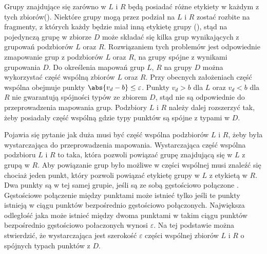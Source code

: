 Grupy znajdujące się zarówno w $ L $ i $ R $ będą posiadać różne etykiety w każdym z tych zbiorów(). Niektóre grupy mogą przez podział na $ L $ i $ R $ zostać rozbite na fragmenty, z których każdy będzie miał inną etykietę grupy (), stąd na pojedynczą grupę w zbiorze $ D $ może składać się kilka grup wynikających z grupowań podzbiorów $ L $ oraz $ R $. Rozwiązaniem tych problemów jest odpowiednie zmapowanie grup z podzbiorów $ L $ oraz $ R $, na grupy spójne z wynikami grupowania $ D $. Do określenia mapowań grup $ L $, $ R $ na grupy $ D $ można wykorzystać część wspólną zbiorów $ L $ oraz $ R $. Przy obecnych założeniach część wspólna obejmuje punkty $ \abs{v_d - b} \le \varepsilon $. Punkty $ v_d > b $ dla $ L $ oraz $ v_d < b $ dla $ R $ nie gwarantują spójności typów ze zbiorem $ D $, stąd nie są odpowiednie do przeprowadzenia mapowania grup. Podzbiory $ L $ i $ R $ należy dalej rozszerzyć tak, żeby posiadały część wspólną gdzie typy punktów są spójne z typami w $ D $.\par

Pojawia się pytanie jak duża musi być część wspólna podzbiorów $ L $ i $ R $, żeby była wystarczająca do przeprowadzenia mapowania. Wystarczająca część wspólna podzbioru $ L $ i $ R $ to taka, która pozwoli powiązać grupę znajdującą się w $ L $ z grupą w $ R $. Aby powiązanie grup było możliwe w części wspólnej musi znaleźć się chociaż jeden punkt, który pozwoli powiązać etykietę grupy w $ L $ z etykietą w $ R $. Dwa punkty są w tej samej grupie, jeśli są ze sobą gęstościowo połączone \cite{dbscan}. Gęstościowe połączenie między punktami może istnieć tylko jeśli te punkty istnieją w ciągu punktów bezpośrednio gęstościowo połączonych. Największa odległość jaka może istnieć między dwoma punktami w takim ciągu punktów bezpośrednio gęstościowo połaczonych wynosi $ \varepsilon $. Na tej podstawie można stwierdzić, że wystarczająca jest szerokość $ \varepsilon $ części wspólnej zbiorów $ L $ i $ R $ o spójnych typach punktów z $ D $.\par

